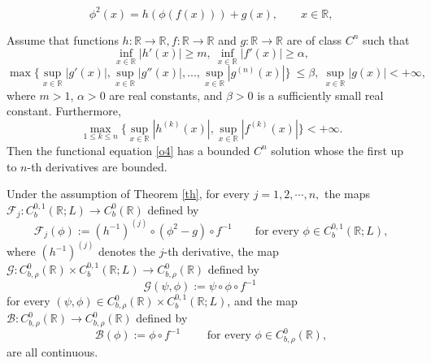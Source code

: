 \documentclass[10pt,a4paper]{amsart}
\begin{document}
\begin{equation}\label{o4}
    \phi^2(x) = h(\phi(f(x))) +g(x), \qquad x\in \mathbb{R},
\end{equation}

\begin{theorem}\label{th}
Assume that functions $h:\mathbb{R} \to \mathbb{R}, f:\mathbb{R} \to  \mathbb{R}$ and $g:\mathbb{R} \to \mathbb{R}$ are of class $C^{n}$ such that
\begin{equation}\label{o}
\inf_{x\in \mathbb{R}}|h'(x)|\ge m, 
~\inf_{x\in \mathbb{R}}|f'(x)|\ge \alpha,
\end{equation}
\begin{equation}\label{gjie}
\max\Big\{\sup_{x\in \mathbb{R}}|g'(x)|,\sup_{x\in \mathbb{R}}|g''(x)|,...,\sup_{x\in \mathbb{R}}|g^{(n)}(x)| \Big\}~\le \beta, ~\sup_{x\in \mathbb{R}}|g(x)|<+\infty,~
\end{equation}
 where $m > 1$, $\alpha > 0$ are real constants, and $\beta > 0$ is a sufficiently small real constant.
Furthermore, 
\begin{equation}\label{oo}
\max_{1\le k\le n}\Big\{ \sup_{x\in \mathbb{R}}|h^{(k)}(x)|,
  \sup_{x\in \mathbb{R}}|f^{(k)}(x)|
 \Big\}< +\infty.
 \end{equation}
Then the functional equation \eqref{o4}
has a bounded $C^{n}$ solution whose the first up to $n$-th derivatives are bounded.
\end{theorem}

\begin{lemma} \label{coninuous of fg}
Under the assumption of Theorem \ref{th}, for every $j=1,2,\cdots,n,$ the maps $\mathcal{F}_j:  C^{0,1}_b(\mathbb{R};L) \to C^0_b(\mathbb{R})$ defined by \[\mathcal{F}_j(\phi):=(h^{-1})^{(j)}\circ (\phi^{2} -g )\circ f^{-1} \qquad \text{for every } \phi\in C^{0,1}_b(\mathbb{R};L),  \]
where $(h^{-1})^{(j)}$ denotes the $j$-th derivative, the map $\mathcal{G}: C^0_{b,\rho }(\mathbb{R})  \times C^{0,1}_b(\mathbb{R};L) \to  C^0_{b,\rho }(\mathbb{R})$ defined by 
\[\mathcal{G} (\psi,\phi):= \psi \circ \phi \circ f^{-1} \qquad  \]
for every $(\psi,\phi) \in C^0_{b,\rho }(\mathbb{R})\times C^{0,1}_b(\mathbb{R};L)$, and the map $\mathcal{B}:  C^0_{b,\rho }(\mathbb{R}) \to  C^0_{b,\rho }(\mathbb{R})$ defined by
$$ \mathcal{B}(\phi) := \phi \circ f^{-1} \qquad\text{ for every } \phi \in C_{b,\rho}^{0}(\mathbb{R}), $$
are all continuous.

\end{lemma}
\end{document}
